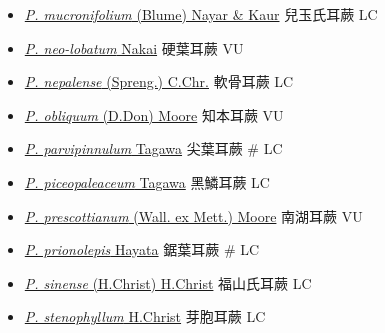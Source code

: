\begin{itemize}
\begin{itemize}
        \item[] \href{http://www.theplantlist.org/tpl1.1/search?q=Polystichum+mucronifolium}{\textit{P. mucronifolium} (Blume) Nayar \& Kaur}   兒玉氏耳蕨   LC
        \item[] \href{http://www.theplantlist.org/tpl1.1/search?q=Polystichum+neo-lobatum}{\textit{P. neo-lobatum} Nakai}   硬葉耳蕨   VU
        \item[] \href{http://www.theplantlist.org/tpl1.1/search?q=Polystichum+nepalense}{\textit{P. nepalense} (Spreng.) C.Chr.}   軟骨耳蕨   LC
        \item[] \href{http://www.theplantlist.org/tpl1.1/search?q=Polystichum+obliquum}{\textit{P. obliquum} (D.Don) Moore}   知本耳蕨   VU
        \item[] \href{http://www.theplantlist.org/tpl1.1/search?q=Polystichum+parvipinnulum}{\textit{P. parvipinnulum} Tagawa}   尖葉耳蕨  \# LC
        \item[] \href{http://www.theplantlist.org/tpl1.1/search?q=Polystichum+piceopaleaceum}{\textit{P. piceopaleaceum} Tagawa}   黑鱗耳蕨   LC
        \item[] \href{http://www.theplantlist.org/tpl1.1/search?q=Polystichum+prescottianum}{\textit{P. prescottianum} (Wall. ex Mett.) Moore}   南湖耳蕨   VU
        \item[] \href{http://www.theplantlist.org/tpl1.1/search?q=Polystichum+prionolepis}{\textit{P. prionolepis} Hayata}   鋸葉耳蕨  \# LC
        \item[] \href{http://www.theplantlist.org/tpl1.1/search?q=Polystichum+sinense}{\textit{P. sinense} (H.Christ) H.Christ}   福山氏耳蕨   LC
        \item[] \href{http://www.theplantlist.org/tpl1.1/search?q=Polystichum+stenophyllum}{\textit{P. stenophyllum} H.Christ}   芽胞耳蕨   LC

\end{itemize}
\end{itemize}
